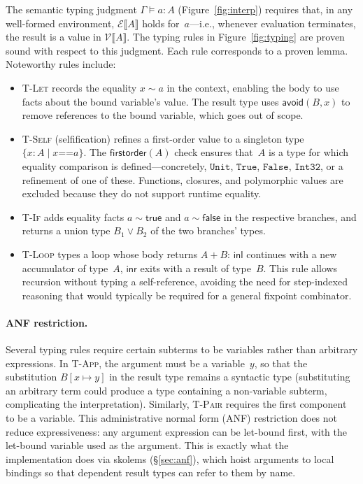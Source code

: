 \documentclass[acmsmall]{acmart}
\begin{document}
The semantic typing judgment $\Gamma \vDash a : A$ (Figure~\ref{fig:interp}) requires that, in any well-formed environment, $\mathcal{E}\llbracket A \rrbracket$ holds for~$a$---i.e., whenever evaluation terminates, the result is a value in $\mathcal{V}\llbracket A \rrbracket$.
The typing rules in Figure~\ref{fig:typing} are proven sound with respect to this judgment. Each rule corresponds to a proven lemma. Noteworthy rules include:
\begin{itemize}
  \item \textsc{T-Let} records the equality $x \sim a$ in the context, enabling the body to use facts about the bound variable's value. The result type uses $\textsf{avoid}(B, x)$ to remove references to the bound variable, which goes out of scope.
  \item \textsc{T-Self} (selfification) refines a first-order value to a singleton type $\{x : A \mid x \mathbin{\texttt{==}} a\}$. The $\textsf{firstorder}(A)$ check ensures that~$A$ is a type for which equality comparison is defined---concretely, $\texttt{Unit}$, $\texttt{True}$, $\texttt{False}$, $\texttt{Int32}$, or a refinement of one of these. Functions, closures, and polymorphic values are excluded because they do not support runtime equality.
  \item \textsc{T-If} adds equality facts $a \sim \textsf{true}$ and $a \sim \textsf{false}$ in the respective branches, and returns a union type $B_1 \lor B_2$ of the two branches' types.
  \item \textsc{T-Loop} types a loop whose body returns $A + B$: $\textsf{inl}$ continues with a new accumulator of type~$A$, $\textsf{inr}$ exits with a result of type~$B$. This rule allows recursion without typing a self-reference, avoiding the need for step-indexed reasoning that would typically be required for a general fixpoint combinator.
\end{itemize}

\paragraph{ANF restriction.}
Several typing rules require certain subterms to be variables rather than arbitrary expressions. In \textsc{T-App}, the argument must be a variable~$y$, so that the substitution $B[x \mapsto y]$ in the result type remains a syntactic type (substituting an arbitrary term could produce a type containing a non-variable subterm, complicating the interpretation). Similarly, \textsc{T-Pair} requires the first component to be a variable. This administrative normal form (ANF) restriction does not reduce expressiveness: any argument expression can be let-bound first, with the let-bound variable used as the argument. This is exactly what the implementation does via skolems (\S\ref{sec:anf}), which hoist arguments to local bindings so that dependent result types can refer to them by name.
\end{document}
